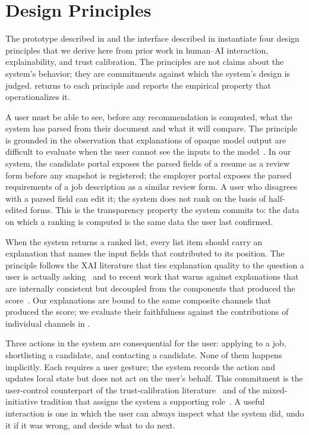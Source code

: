 \section{Design Principles}\label{sec:3}

The prototype described in  and the interface described in  instantiate four design principles that we derive here from prior work in human--{AI} interaction, explainability, and trust calibration.
The principles are not claims about the system's behavior; they are commitments against which the system's design is judged.
 returns to each principle and reports the empirical property that operationalizes it.

A user must be able to see, before any recommendation is computed, what the system has parsed from their document and what it will compare.
The principle is grounded in the observation that explanations of opaque model output are difficult to evaluate when the user cannot see the inputs to the model~\cite{amershi2019guidelines,liao2020questioning}.
In our system, the candidate portal exposes the parsed fields of a resume as a review form before any snapshot is registered; the employer portal exposes the parsed requirements of a job description as a similar review form.
A user who disagrees with a parsed field can edit it; the system does not rank on the basis of half-edited forms.
This is the transparency property the system commits to: the data on which a ranking is computed is the same data the user last confirmed.

When the system returns a ranked list, every list item should carry an explanation that names the input fields that contributed to its position.
The principle follows the {XAI} literature that ties explanation quality to the question a user is actually asking~\cite{miller2019explanation,ehsan2022operationalizing} and to recent work that warns against explanations that are internally consistent but decoupled from the components that produced the score~\cite{joshi2021real}.
Our explanations are bound to the same composite channels that produced the score; we evaluate their faithfulness against the contributions of individual channels in .

Three actions in the system are consequential for the user: applying to a job, shortlisting a candidate, and contacting a candidate.
None of them happens implicitly.
Each requires a user gesture; the system records the action and updates local state but does not act on the user's behalf.
This commitment is the user-control counterpart of the trust-calibration literature~\cite{lee2004trust,parasuraman1997humans,shneiderman2020human} and of the mixed-initiative tradition that assigns the system a supporting role~\cite{horvitz1999principles,amershi2014power,kulesza2015principles}.
A useful interaction is one in which the user can always inspect what the system did, undo it if it was wrong, and decide what to do next.

